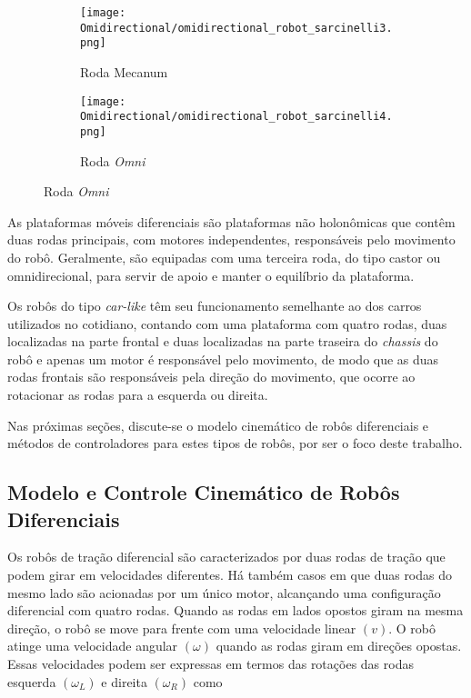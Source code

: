 \begin{figure}[htb]
    \caption{Rodas de Robôs Omnidirecionais}
    \centering    
    \begin{subfigure}[b]{0.2\textwidth}
        \texttt{[image: Omidirectional/omidirectional\_robot\_sarcinelli3.png]}
        \caption{Roda Mecanum}
    \end{subfigure}
    \hspace{0.1\textwidth}
    \begin{subfigure}[b]{0.2\textwidth}
        \texttt{[image: Omidirectional/omidirectional\_robot\_sarcinelli4.png]}
        \caption{Roda \textit{Omni}}
    \end{subfigure}
    \source
    \label{fig:rodas_omnidirecionais}
\end{figure}


As plataformas móveis diferenciais são plataformas não holonômicas que contêm duas rodas principais, com motores independentes, responsáveis pelo movimento do robô. Geralmente, são equipadas com uma terceira roda, do tipo castor ou omnidirecional, para servir de apoio e manter o equilíbrio da plataforma.

Os robôs do tipo \textit{car-like} têm seu funcionamento semelhante ao dos carros utilizados no cotidiano, contando com uma plataforma com quatro rodas, duas localizadas na parte frontal e duas localizadas na parte traseira do \textit{chassis} do robô e apenas um motor é responsável pelo movimento, de modo que as duas rodas frontais são responsáveis pela direção do movimento, que ocorre ao rotacionar as rodas para a esquerda ou direita.

Nas próximas seções, discute-se o modelo cinemático de robôs diferenciais e métodos de controladores para estes tipos de robôs, por ser o foco deste trabalho.


    \subsection{Modelo e Controle Cinemático de Robôs Diferenciais}
    \label{sec:Modelo_Robos_Diferenciais}
    Os robôs de tração diferencial são caracterizados por duas rodas de tração que podem girar em velocidades diferentes. Há também casos em que duas rodas do mesmo lado são acionadas por um único motor, alcançando uma configuração diferencial com quatro rodas. Quando as rodas em lados opostos giram na mesma direção, o robô se move para frente com uma velocidade linear $(v)$. O robô atinge uma velocidade angular $(\omega)$ quando as rodas giram em direções opostas. Essas velocidades podem ser expressas em termos das rotações das rodas esquerda $(\omega_L)$ e direita $(\omega_R)$ como
    
